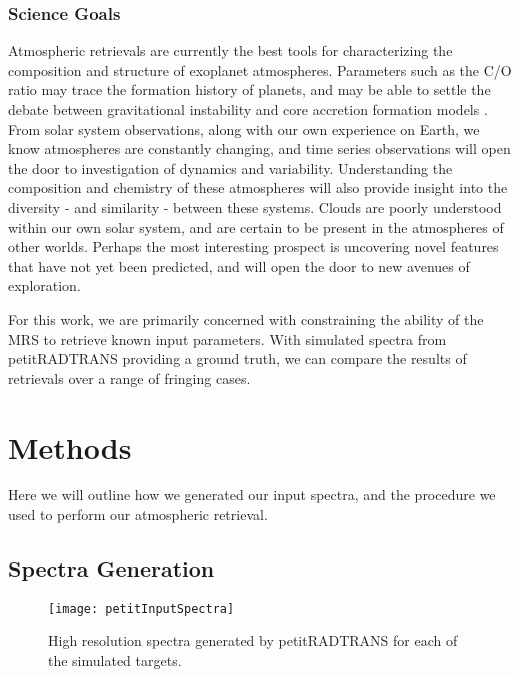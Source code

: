 \subsubsection{Science Goals}
Atmospheric retrievals are currently the best tools for characterizing the composition and structure of exoplanet atmospheres. 
Parameters such as the C/O ratio may trace the formation history of planets, and may be able to settle the debate between gravitational instability and core accretion formation models \parencite{Madhusudhan2012,Moses2013}.
From solar system observations, along with our own experience on Earth, we know atmospheres are constantly changing, and time series observations will open the door to investigation of dynamics and variability.
Understanding the composition and chemistry of these atmospheres will also provide insight into the diversity - and similarity - between these systems.
Clouds are poorly understood within our own solar system, and are certain to be present in the atmospheres of other worlds.
Perhaps the most interesting prospect is uncovering novel features that have not yet been predicted, and will open the door to new avenues of exploration.

For this work, we are primarily concerned with constraining the ability of the MRS to retrieve known input parameters. 
With simulated spectra from petitRADTRANS providing a ground truth, we can compare the results of retrievals over a range of fringing cases.


\section{Methods}
Here we will outline how we generated our input spectra, and the procedure we used to perform our atmospheric retrieval.
\subsection{Spectra Generation}
\begin{figure}[t]
	\texttt{[image: petitInputSpectra]}
	\caption{High resolution spectra generated by petitRADTRANS for each of the simulated targets.}
	\label{fig:petitinput}
\end{figure}

